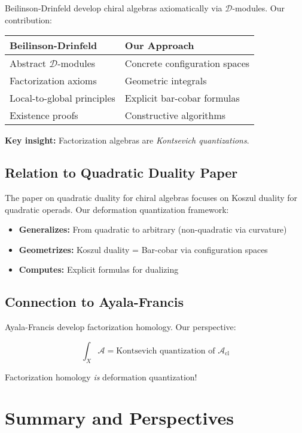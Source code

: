 Beilinson-Drinfeld \cite{BD04} develop chiral algebras axiomatically via $\mathcal{D}$-modules. Our contribution:

\begin{center}
\begin{tabular}{|l|l|}
\hline
\textbf{Beilinson-Drinfeld} & \textbf{Our Approach} \\
\hline
Abstract $\mathcal{D}$-modules & Concrete configuration spaces \\
Factorization axioms & Geometric integrals \\
Local-to-global principles & Explicit bar-cobar formulas \\
Existence proofs & Constructive algorithms \\
\hline
\end{tabular}
\end{center}

\textbf{Key insight:} Factorization algebras are \emph{Kontsevich quantizations}.

\subsection{Relation to Quadratic Duality Paper}

The paper on quadratic duality for chiral algebras \cite{QuadDual} focuses on Koszul duality for quadratic operads. Our deformation quantization framework:

\begin{itemize}
\item \textbf{Generalizes:} From quadratic to arbitrary (non-quadratic via curvature)
\item \textbf{Geometrizes:} Koszul duality = Bar-cobar via configuration spaces
\item \textbf{Computes:} Explicit formulas for dualizing
\end{itemize}

\subsection{Connection to Ayala-Francis}

Ayala-Francis \cite{AF15} develop factorization homology. Our perspective:

$$\int_X \mathcal{A} = \text{Kontsevich quantization of } \mathcal{A}_{\text{cl}}$$

Factorization homology \emph{is} deformation quantization!

\section{Summary and Perspectives}

